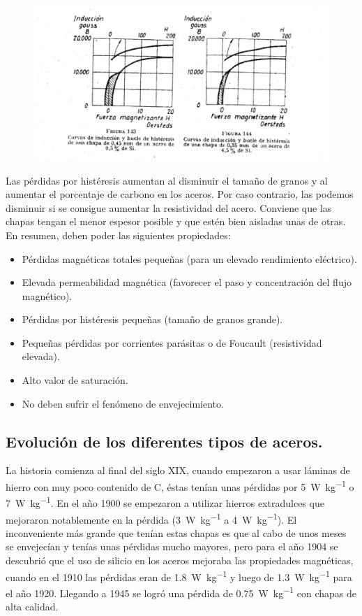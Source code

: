 \documentclass[12pt,a4paper]{article}
\begin{document}
\begin{figure}[H]    
    \centering         
    \includegraphics[width=1\textwidth]{IMAGENES LATEX/2.png}
\end{figure}

Las pérdidas por histéresis aumentan al disminuir el tamaño de granos y al aumentar el porcentaje de carbono en los aceros. Por caso contrario, las podemos disminuir si se consigue aumentar la resistividad del acero. Conviene que las chapas tengan el menor espesor posible y que estén bien aisladas unas de otras. En resumen, deben poder las siguientes propiedades:

\begin{itemize}
    \item Pérdidas magnéticas totales pequeñas (para un elevado rendimiento eléctrico).
    \item Elevada permeabilidad magnética (favorecer el paso y concentración del flujo magnético).
    \item Pérdidas por histéresis pequeñas (tamaño de granos grande).
    \item Pequeñas pérdidas por corrientes parásitas o de Foucault (resistividad elevada).
    \item Alto valor de saturación.
    \item No deben sufrir el fenómeno de envejecimiento.
\end{itemize}

\subsection{Evolución de los diferentes tipos de aceros.}

La historia comienza al final del siglo XIX, cuando empezaron a usar láminas de hierro con muy poco contenido de C, éstas tenían unas pérdidas por \SI{5}{\watt\per\kilogram} o \SI{7}{\watt\per\kilogram}. En el año 1900 se empezaron a utilizar hierros extradulces que mejoraron notablemente en la pérdida (\SI{3}{\watt\per\kilogram} a \SI{4}{\watt\per\kilogram}). El inconveniente más grande que tenían estas chapas es que al cabo de unos meses se envejecían y tenías unas pérdidas mucho mayores, pero para el año 1904 se descubrió que el uso de silicio en los aceros mejoraba las propiedades magnéticas, cuando en el 1910 las pérdidas eran de \SI{1,8}{\watt\per\kilogram} y luego de \SI{1,3}{\watt\per\kilogram} para el año 1920. Llegando a 1945 se logró una pérdida de \SI{0,75}{\watt\per\kilogram} con chapas de alta calidad.
\end{document}
